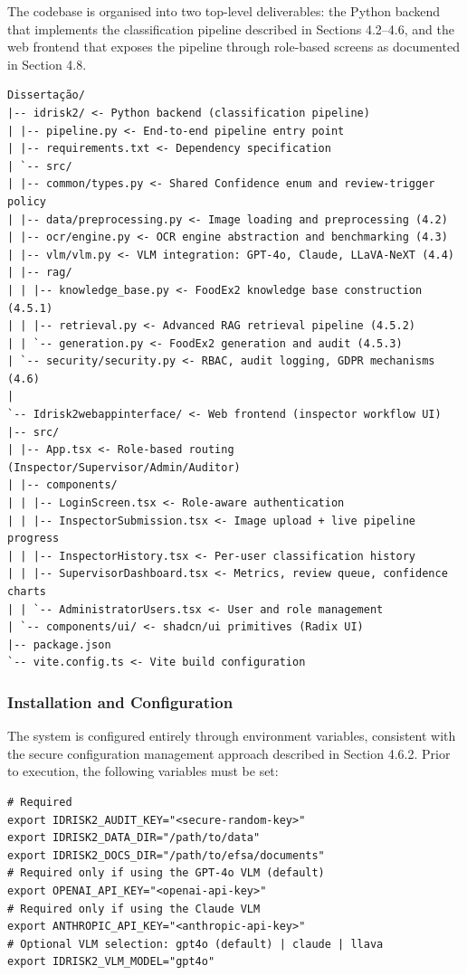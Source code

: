 The codebase is organised into two top-level deliverables: the Python backend that implements the classification pipeline described in Sections 4.2--4.6, and the web frontend that exposes the pipeline through role-based screens as documented in Section 4.8.

\begin{verbatim}
Dissertação/
|-- idrisk2/ <- Python backend (classification pipeline)
| |-- pipeline.py <- End-to-end pipeline entry point
| |-- requirements.txt <- Dependency specification
| `-- src/
| |-- common/types.py <- Shared Confidence enum and review-trigger policy
| |-- data/preprocessing.py <- Image loading and preprocessing (4.2)
| |-- ocr/engine.py <- OCR engine abstraction and benchmarking (4.3)
| |-- vlm/vlm.py <- VLM integration: GPT-4o, Claude, LLaVA-NeXT (4.4)
| |-- rag/
| | |-- knowledge_base.py <- FoodEx2 knowledge base construction (4.5.1)
| | |-- retrieval.py <- Advanced RAG retrieval pipeline (4.5.2)
| | `-- generation.py <- FoodEx2 generation and audit (4.5.3)
| `-- security/security.py <- RBAC, audit logging, GDPR mechanisms (4.6)
|
`-- Idrisk2webappinterface/ <- Web frontend (inspector workflow UI)
|-- src/
| |-- App.tsx <- Role-based routing (Inspector/Supervisor/Admin/Auditor)
| |-- components/
| | |-- LoginScreen.tsx <- Role-aware authentication
| | |-- InspectorSubmission.tsx <- Image upload + live pipeline progress
| | |-- InspectorHistory.tsx <- Per-user classification history
| | |-- SupervisorDashboard.tsx <- Metrics, review queue, confidence charts
| | `-- AdministratorUsers.tsx <- User and role management
| `-- components/ui/ <- shadcn/ui primitives (Radix UI)
|-- package.json
`-- vite.config.ts <- Vite build configuration
\end{verbatim}

\hypertarget{installation-and-configuration}{%
\subsubsection{Installation and Configuration}\label{installation-and-configuration}}

The system is configured entirely through environment variables, consistent with the secure configuration management approach described in Section 4.6.2. Prior to execution, the following variables must be set:

\begin{verbatim}
# Required
export IDRISK2_AUDIT_KEY="<secure-random-key>"
export IDRISK2_DATA_DIR="/path/to/data"
export IDRISK2_DOCS_DIR="/path/to/efsa/documents"
# Required only if using the GPT-4o VLM (default)
export OPENAI_API_KEY="<openai-api-key>"
# Required only if using the Claude VLM
export ANTHROPIC_API_KEY="<anthropic-api-key>"
# Optional VLM selection: gpt4o (default) | claude | llava
export IDRISK2_VLM_MODEL="gpt4o"
\end{verbatim}

